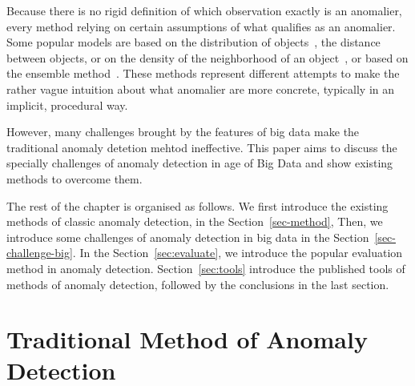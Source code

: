Because there is no rigid definition of which
observation exactly is an anomalier,
every method relying on certain assumptions of
what qualifies as an anomalier.
Some popular models are based on
the distribution of
objects~\cite{siripanadorn2010anomaly,chandola2009anomaly,kromanis2013support},
the distance~\cite{knorr1997unified}
between objects,
or on the density of
the neighborhood of
an object~\cite{agyemang2004algorithm,breunig2000lof,papadimitriou2003loci},
or based on the ensemble method~\cite{zhou2012ensemble}.
These methods represent different attempts to make
the rather vague intuition about
what anomalier are more concrete,
typically in an implicit,
procedural way.

However,
many challenges brought by the features of big data make 
the traditional anomaly detetion mehtod ineffective. 
This paper aims to discuss 
the specially challenges of anomaly detection in age of Big Data and 
show existing methods to overcome them. 


The rest of the chapter is organised as follows.
We first introduce the existing methods of classic anomaly detection,
in the Section~\ref{sec-method},
Then,
we introduce some challenges of anomaly detection in big data
in the Section~\ref{sec-challenge-big}.
In the Section~\ref{sec:evaluate},
we introduce the popular evaluation method in anomaly detection.
Section~\ref{sec:tools} introduce the published tools of
methods of anomaly detection,
followed by the conclusions in the last section.

\section{Traditional Method of Anomaly Detection}~\label{sec-method}

